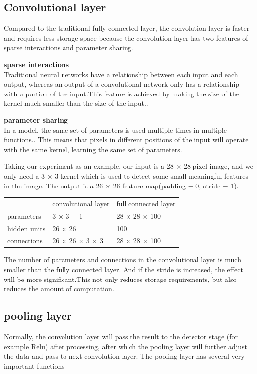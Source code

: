 \documentclass{article}
\begin{document}
\subsection{Convolutional layer}

Compared to the traditional fully connected layer, the convolution layer is faster and requires less storage space because the convolution layer has two features of sparse interactions and parameter sharing.

\textbf{sparse interactions}\\
Traditional neural networks have a relationship between each input and each output, whereas an output of a convolutional network only has a relationship with a portion of the input.This feature is achieved by making the size of the kernel much smaller than the size of the input.\cite{deeplearning2016}.

\textbf{parameter sharing}\\
In a model, the same set of parameters is used multiple times in multiple functions.\cite{deeplearning2016}.
This means that pixels in different positions of the input will operate with the same kernel, learning the same set of parameters.

Taking our experiment as an example, our input is a 28 $\times$ 28 pixel image, and we only need a 3 $\times$ 3 kernel which is used to detect some small meaningful features in the image. The output is a 26 $\times$ 26 feature map(padding = 0, stride = 1).

\begin{table}[H]
  \centering
    \begin{tabular}{lll}
          & convolutional layer & full connected layer \\
    parameters & 3 $\times$ 3 + 1  & 28 $\times$ 28 $\times$ 100  \\
    hidden units & 26 $\times$ 26 & 100 \\
    connections & 26 $\times$ 26 $\times$ 3 $\times$ 3 & 28 $\times$ 28 $\times$ 100 \\
    \end{tabular}%
  \label{clayertable1}
\end{table}%
The number of parameters and connections in the convolutional layer is much smaller than the fully connected layer. And if the stride is increased, the effect will be more significant.This not only reduces storage requirements, but also reduces the amount of computation.
\subsection{pooling layer}
Normally, the convolution layer will pass the result to the detector stage (for example Relu) after processing, after which the pooling layer will further adjust the data and pass to next convolution layer.
The pooling layer has several very important functions\\
\end{document}
